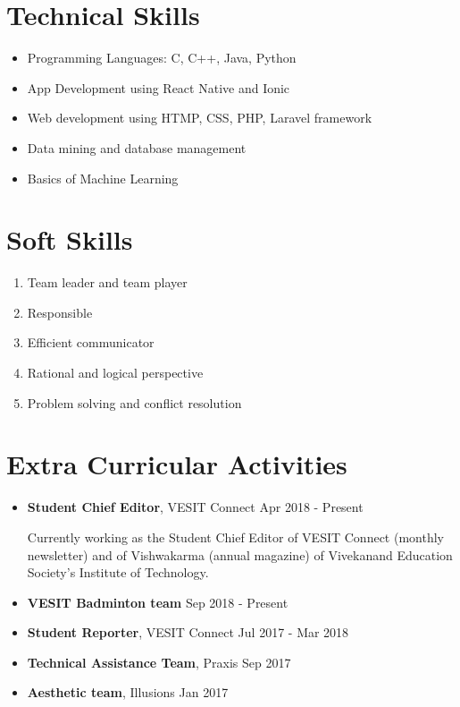 \documentclass[margin]{res}
\begin{document}
\begin{resume}
\section{Technical Skills}
\begin{itemize}
  \item Programming Languages: C, C++, Java, Python
  \item App Development using React Native and Ionic
  \item Web development using HTMP, CSS, PHP, Laravel framework
  \item Data mining and database management
  \item Basics of Machine Learning
\end{itemize}

\section{Soft Skills}
\begin{enumerate}
  \item Team leader and team player
  \item Responsible
  \item Efficient communicator
  \item Rational and logical perspective
  \item Problem solving and conflict resolution
\end{enumerate}

\section{Extra Curricular Activities}
\begin{itemize}
  \item {\bf Student Chief Editor}, VESIT Connect \hfill Apr 2018 - Present
  
  Currently working as the Student Chief Editor of VESIT Connect (monthly newsletter) and of Vishwakarma (annual magazine)  of Vivekanand Education Society's Institute of Technology. 
  \item {\bf VESIT Badminton team} \hfill Sep 2018 - Present
  \item {\bf Student Reporter}, VESIT Connect \hfill Jul 2017 - Mar 2018
  \item {\bf Technical Assistance Team}, Praxis \hfill Sep 2017
  \item {\bf Aesthetic team}, Illusions \hfill Jan 2017
\end{itemize}

\end{resume}
\end{document}
